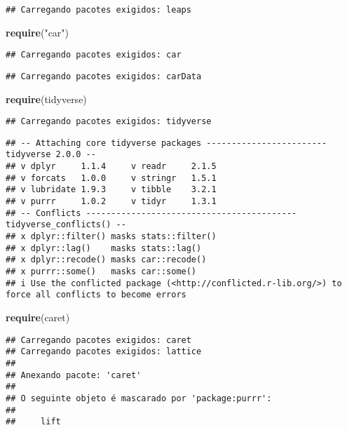 \documentclass[
]{article}
\newenvironment{Shaded}{\begin{snugshade}}{\end{snugshade}}
\newcommand{\FunctionTok}[1]{\textcolor[rgb]{0.13,0.29,0.53}{\textbf{#1}}}
\newcommand{\NormalTok}[1]{#1}
\newcommand{\StringTok}[1]{\textcolor[rgb]{0.31,0.60,0.02}{#1}}
\begin{document}
\begin{verbatim}
## Carregando pacotes exigidos: leaps
\end{verbatim}

\begin{Shaded}
\begin{Highlighting}[]
\FunctionTok{require}\NormalTok{(}\StringTok{"car"}\NormalTok{)}
\end{Highlighting}
\end{Shaded}

\begin{verbatim}
## Carregando pacotes exigidos: car
\end{verbatim}

\begin{verbatim}
## Carregando pacotes exigidos: carData
\end{verbatim}

\begin{Shaded}
\begin{Highlighting}[]
\FunctionTok{require}\NormalTok{(tidyverse)}
\end{Highlighting}
\end{Shaded}

\begin{verbatim}
## Carregando pacotes exigidos: tidyverse
\end{verbatim}

\begin{verbatim}
## -- Attaching core tidyverse packages ------------------------ tidyverse 2.0.0 --
## v dplyr     1.1.4     v readr     2.1.5
## v forcats   1.0.0     v stringr   1.5.1
## v lubridate 1.9.3     v tibble    3.2.1
## v purrr     1.0.2     v tidyr     1.3.1
## -- Conflicts ------------------------------------------ tidyverse_conflicts() --
## x dplyr::filter() masks stats::filter()
## x dplyr::lag()    masks stats::lag()
## x dplyr::recode() masks car::recode()
## x purrr::some()   masks car::some()
## i Use the conflicted package (<http://conflicted.r-lib.org/>) to force all conflicts to become errors
\end{verbatim}

\begin{Shaded}
\begin{Highlighting}[]
\FunctionTok{require}\NormalTok{(caret)}
\end{Highlighting}
\end{Shaded}

\begin{verbatim}
## Carregando pacotes exigidos: caret
## Carregando pacotes exigidos: lattice
## 
## Anexando pacote: 'caret'
## 
## O seguinte objeto é mascarado por 'package:purrr':
## 
##     lift
\end{verbatim}
\end{document}
